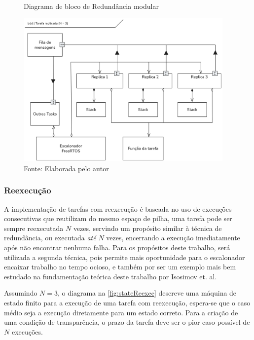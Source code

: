 \begin{figure}[H]
    \centering
    \captionsetup{justification=centering}
    \caption{Diagrama de bloco de Redundância modular}
    \includegraphics[width=0.950\textwidth]{assets/tmr_bdd.png}
    \captionsetup{justification=raggedright}
    \caption*{Fonte: Elaborada pelo autor}
    \label{fig:bddTMR}
\end{figure}

\subsubsection{Reexecução}

A implementação de tarefas com reexecução é baseada no uso de execuções consecutivas que reutilizam do mesmo espaço de pilha, uma tarefa pode ser sempre reexecutada $N$ vezes, servindo um propósito similar à técnica de redundância, ou executada \textit{até} $N$ vezes, encerrando a execução imediatamente após não encontrar nenhuma falha. Para os propósitos deste trabalho, será utilizada a segunda técnica, pois permite mais oportunidade para o escalonador encaixar trabalho no tempo ocioso, e também por ser um exemplo mais bem estudado na fundamentação teórica deste trabalho por Isosimov et. al.

Assumindo $N = 3$, o diagrama na \autoref{fig:stateReexec} descreve uma máquina de estado finito para a execução de uma tarefa com reexecução, espera-se que o caso médio seja a execução diretamente para um estado correto. Para a criação de uma condição de transparência, o prazo da tarefa deve ser o pior caso possível de $N$ execuções.

